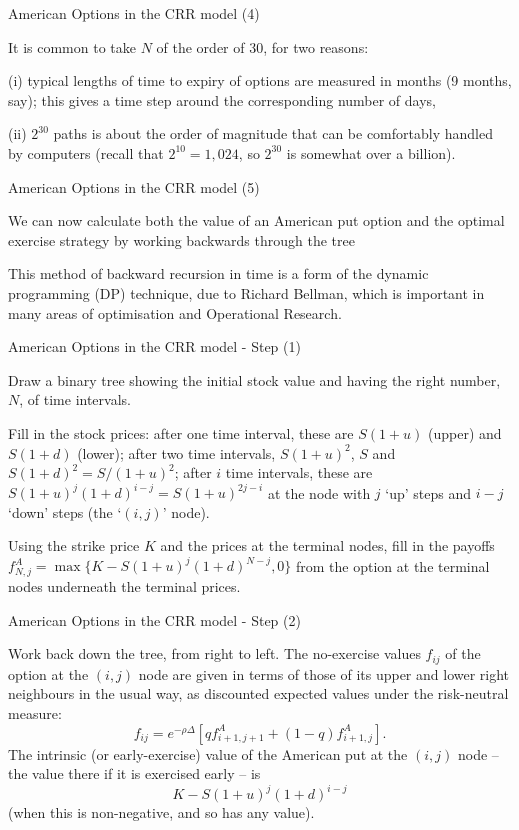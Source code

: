 { American Options in the CRR model (4)}
  \item It is common to take $N$ of the order of 30, for
two reasons:
  \item (i) typical lengths of time to expiry of
options are measured in months (9 months, say); this
gives a time step around the corresponding number of days,
\item (ii) $2^{30}$ paths is about the order of magnitude that can be
comfortably handled by computers (recall that $2^{10} = 1,024$, so
$2^{30}$ is somewhat over a billion).

{ American Options in the CRR model (5)}

  \item We can now calculate both the value of an American put option and
the optimal exercise strategy by working backwards through the
tree
 \item This method of backward recursion in time is a form of the
dynamic programming (DP) technique, \label{dynamic programming}
due to Richard Bellman, which is important in many areas of
optimisation and Operational Research.

{American Options in the CRR model - Step (1)}

  \item  Draw a binary
tree showing the initial stock value and having the
right number, $N$, of time intervals.
  \item  Fill in the stock prices: after one time interval, these are
$S(1+u)$ (upper) and $S(1+d)$ (lower); after two time intervals,
$S(1+u)^2$, $S$ and $ S(1+d)^2 = S/(1+u)^2$; after $i$ time
intervals, these are $S(1+u)^j (1+d)^{i-j} = S (1+u)^{2j- i}$ at
the node with
$j$ `up' steps and $i-j$ `down' steps (the `$(i,j)$' node).
  \item  Using the strike price $K$ and the prices at the terminal
nodes, fill in the payoffs $f^A_{N,j} = \max\{K - S (1+u)^j
(1+d)^{N-j}, 0\}$ from the option
at the terminal nodes underneath the terminal prices.

{American Options in the CRR model - Step (2)}
\setcounter{enumi}{3}
\item  Work back down the tree, from right to left. The no-exercise
values $f_{ij}$ of the option at the $(i,j)$ node are given in
terms of those of its upper and lower right neighbours in the
usual way, as discounted expected values under the risk-neutral
measure:
$$
f_{ij} = e^{-\rho \Delta } [q f^A_{i+1,j+1} + (1 - q)
f^A_{i+1,j}].
$$
The intrinsic (or early-exercise) value of the American put at the
$(i,j)$
 node -- the value there if it is exercised early -- is
$$
K - S (1+u)^j (1+d)^{i-j}
$$
(when this is non-negative, and so has any value).

